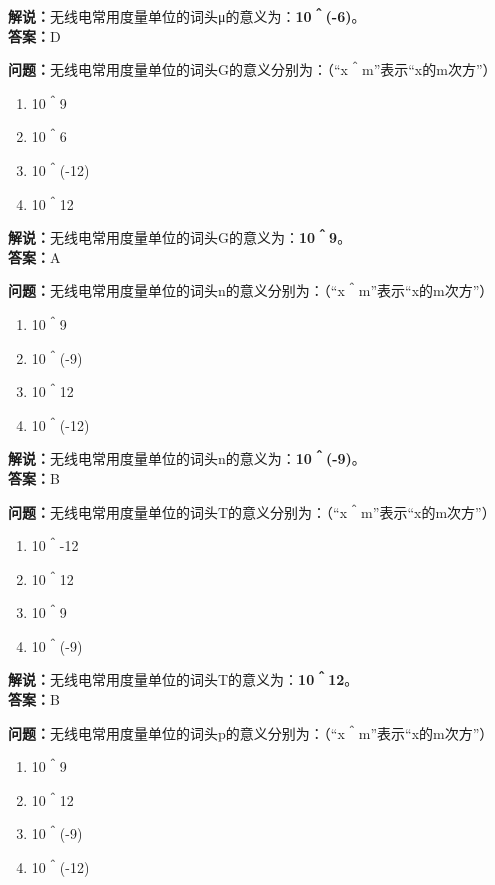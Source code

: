 \textbf{解说：}无线电常用度量单位的词头μ的意义为：\textbf{10＾(-6)}。\\\textbf{答案：}D



\textbf{问题：}无线电常用度量单位的词头G的意义分别为：（“x＾m”表示“x的m次方”）

\begin{enumerate}[label=\Alph*), leftmargin=1.5cm]
	\item 10＾9
	\item 10＾6
	\item 10＾(-12)
	\item 10＾12
\end{enumerate}

\textbf{解说：}无线电常用度量单位的词头G的意义为：\textbf{10＾9}。\\\textbf{答案：}A



\textbf{问题：}无线电常用度量单位的词头n的意义分别为：（“x＾m”表示“x的m次方”）

\begin{enumerate}[label=\Alph*), leftmargin=1.5cm]
	\item 10＾9
	\item 10＾(-9)
	\item 10＾12
	\item 10＾(-12)
\end{enumerate}

\textbf{解说：}无线电常用度量单位的词头n的意义为：\textbf{10＾(-9)}。\\\textbf{答案：}B



\textbf{问题：}无线电常用度量单位的词头T的意义分别为：（“x＾m”表示“x的m次方”）

\begin{enumerate}[label=\Alph*), leftmargin=1.5cm]
	\item 10＾-12
	\item 10＾12
	\item 10＾9
	\item 10＾(-9)
\end{enumerate}

\textbf{解说：}无线电常用度量单位的词头T的意义为：\textbf{10＾12}。\\\textbf{答案：}B



\textbf{问题：}无线电常用度量单位的词头p的意义分别为：（“x＾m”表示“x的m次方”）

\begin{enumerate}[label=\Alph*), leftmargin=1.5cm]
	\item 10＾9
	\item 10＾12
	\item 10＾(-9)
	\item 10＾(-12)
\end{enumerate}

